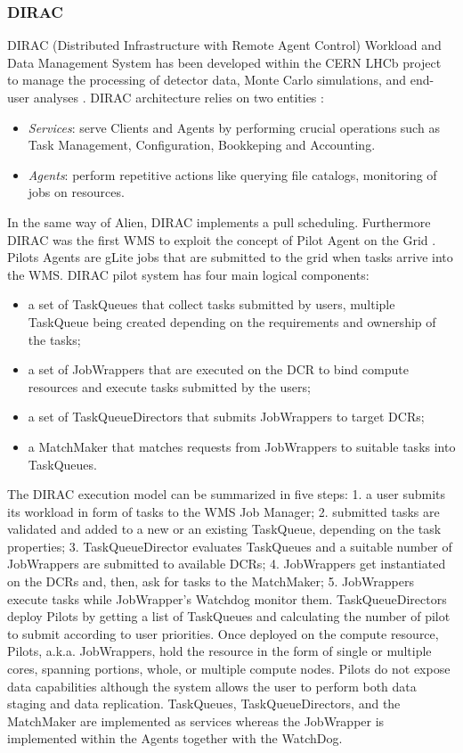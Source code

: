 \subsubsection{DIRAC} 
DIRAC (Distributed Infrastructure with Remote Agent Control) Workload and Data Management System has been developed within the CERN LHCb project to manage the processing of detector data, Monte Carlo simulations, and end-user analyses \cite{Tsaregorodtsev2004}. 
DIRAC  architecture relies on two entities \cite{Paterson2010}:
\begin{itemize}
\item \emph{Services}: serve Clients and Agents by performing crucial operations such as Task Management, Configuration, Bookkeping and Accounting.
\item \emph{Agents}: perform repetitive actions like querying file catalogs,  monitoring of jobs on resources.
\end{itemize}
In the same way of Alien, DIRAC implements a pull scheduling. Furthermore DIRAC was the first WMS to exploit the concept of Pilot Agent on the Grid \cite{Casajus2010}. 
Pilots Agents are gLite jobs that are submitted to the grid when tasks arrive into the WMS. 
DIRAC pilot system has four main logical components:
\begin{itemize}
\item a set of TaskQueues that collect tasks submitted by users, multiple TaskQueue being created depending on the requirements and ownership of the tasks;
\item a set of JobWrappers that are executed on the DCR to bind compute resources and execute tasks submitted by the users;
\item a set of TaskQueueDirectors that submits JobWrappers to target DCRs;
\item a MatchMaker that matches requests from JobWrappers to suitable tasks into TaskQueues.
\end{itemize}
The DIRAC execution model can be summarized in five
steps: 1. a user submits its workload in form of tasks to the WMS Job Manager; 2. submitted tasks are validated and added to a new or an existing TaskQueue, depending on the task properties; 3. TaskQueueDirector evaluates TaskQueues and a suitable number of JobWrappers are submitted to available
DCRs; 4. JobWrappers get instantiated on the DCRs and, then,  ask for tasks to the MatchMaker; 5. JobWrappers execute tasks while JobWrapper’s Watchdog monitor them.
TaskQueueDirectors deploy Pilots by getting a list of TaskQueues and calculating the number of pilot to submit  according to user priorities.
Once deployed on the compute resource, Pilots, a.k.a. JobWrappers, hold the resource in the form of single or multiple cores, spanning portions, whole, or multiple compute nodes. Pilots do not expose data capabilities although the system allows the user to perform both data staging and data replication. 
TaskQueues, TaskQueueDirectors, and the MatchMaker are implemented as services whereas the JobWrapper is implemented within the Agents together with the WatchDog. 

